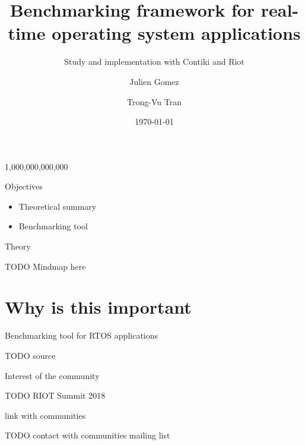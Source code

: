 \documentclass{beamer}
\title{Benchmarking framework for real-time operating system applications}
\subtitle{Study and implementation with Contiki and Riot}
\author{Julien Gomez \and Trong-Vu Tran}
\institute{Université catholique de Louvain}
\date{\today}
\begin{document}

\frame{\titlepage}

\begin{frame}{}
\protect\hypertarget{embedded-systems}{}
\begin{center}
  \LARGE 1,000,000,000,000
\end{center}

\end{frame}

\begin{frame}{Objectives}
\protect\hypertarget{objectives}{}

\begin{itemize}
\tightlist
\item
  Theoretical summary
\item
  Benchmarking tool
\end{itemize}

\end{frame}


\begin{frame}{Theory}
\protect\hypertarget{theory}{}

TODO Mindmap here

\end{frame}


\hypertarget{why-is-this-important}{%
\section{Why is this important}\label{why-is-this-important}}

\begin{frame}{Benchmarking tool for RTOS applications}
\protect\hypertarget{benchmarking-tool-for-rtos-applications}{}

TODO source

\end{frame}


\begin{frame}{Interest of the community}
\protect\hypertarget{interest-of-the-community}{}

TODO RIOT Summit 2018

\end{frame}


\begin{frame}{link with communities}
\protect\hypertarget{link-with-communities}{}

TODO contact with communities mailing list

\end{frame}
\end{document}

